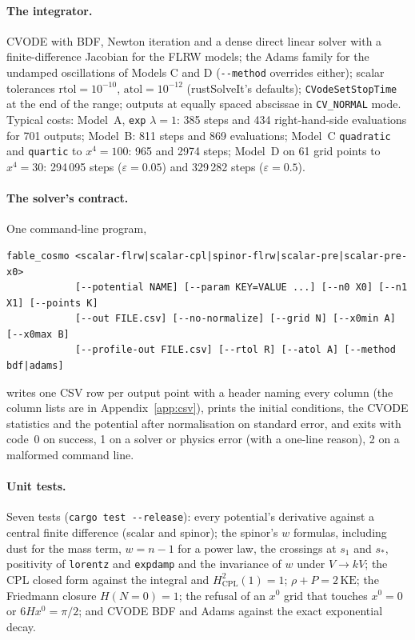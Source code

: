 \documentclass[11pt,a4paper]{article}
\begin{document}
\paragraph{The integrator.} CVODE with BDF, Newton iteration and a dense direct linear solver with
a finite-difference Jacobian for the FLRW models; the Adams family for the undamped oscillations of
Models C and D (\texttt{-{}-method} overrides either); scalar tolerances $\mathrm{rtol}=10^{-10}$,
$\mathrm{atol}=10^{-12}$ (rustSolveIt's defaults); \texttt{CVodeSetStopTime} at the end of the
range; outputs at equally spaced abscissae in \texttt{CV\_NORMAL} mode. Typical costs:
Model~A, \texttt{exp} $\lambda=1$: 385 steps and 434 right-hand-side evaluations for 701 outputs;
Model~B: 811 steps and 869 evaluations; Model~C \texttt{quadratic} and \texttt{quartic} to
$x^4=100$: 965 and 2974 steps; Model~D on 61 grid points to $x^4=30$: 294\,095 steps
($\varepsilon=0.05$) and 329\,282 steps ($\varepsilon=0.5$).

\paragraph{The solver's contract.} One command-line program,
\begin{Verbatim}
fable_cosmo <scalar-flrw|scalar-cpl|spinor-flrw|scalar-pre|scalar-pre-x0>
            [--potential NAME] [--param KEY=VALUE ...] [--n0 X0] [--n1 X1] [--points K]
            [--out FILE.csv] [--no-normalize] [--grid N] [--x0min A] [--x0max B]
            [--profile-out FILE.csv] [--rtol R] [--atol A] [--method bdf|adams]
\end{Verbatim}
writes one CSV row per output point with a header naming every column (the column lists are in
Appendix~\ref{app:csv}), prints the initial conditions, the CVODE statistics and the potential
after normalisation on standard error, and exits with code~0 on success, 1 on a solver or
physics error (with a one-line reason), 2 on a malformed command line.

\paragraph{Unit tests.} Seven tests (\texttt{cargo test -{}-release}): every potential's derivative
against a central finite difference (scalar and spinor); the spinor's $w$ formulas, including dust
for the mass term, $w=n-1$ for a power law, the crossings at $s_1$ and $s_*$, positivity of
\texttt{lorentz} and \texttt{expdamp} and the invariance of $w$ under $V\to kV$; the CPL closed
form against the integral and $H^2_{\mathrm{CPL}}(1)=1$; $\rho+P=2\,\mathrm{KE}$; the Friedmann
closure $H(N=0)=1$; the refusal of an $x^0$ grid that touches $x^0=0$ or $6Hx^0=\pi/2$; and CVODE
BDF and Adams against the exact exponential decay.
\end{document}
